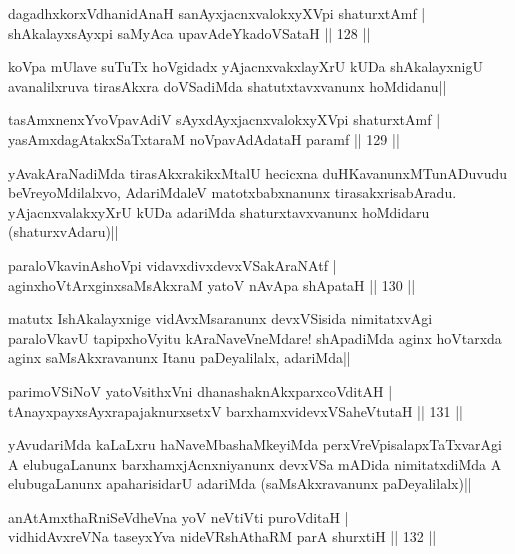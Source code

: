 \begin{shl}
dagadhxkorxVdhanidAnaH sanAyxjacnxvalokxyXV\s pi shaturxtAmf |\\
shAkalayxsAyxpi saMyAca upavAdeYkadoVSataH \hfill || 128 ||
\end{shl}

\begin{artha}
koVpa mUlave suTuTx hoVgidadx yAjacnxvakxlayXrU kUDa shAkalayxnigU avanalilxruva tirasAkxra doVSadiMda shatutxtavxvanunx hoMdidanu|| 
\end{artha}%

\begin{shl}
tasAmxnenxYvoVpavAdiV sAyxdAyxjacnxvalokxyXV\s pi shaturxtAmf |\\
yasAmxdagAtakxSaTxtaraM noVpavAdAdataH paramf \hfill || 129 ||
\end{shl}

\begin{artha}
yAvakAraNadiMda tirasAkxrakikxMtalU hecicxna duHKavanunxMTunADuvudu beVreyoMdilalxvo, AdariMdaleV matotxbabxnanunx tirasakxrisabAradu. yAjacnxvalakxyXrU kUDa adariMda shaturxtavxvanunx hoMdidaru (shaturxvAdaru)||
\end{artha}

\begin{shl}
paraloVkavinAshoV\s pi vidavxdivxdevxVSakAraNAtf |\\
aginxhoVtArxginxsaMsAkxraM yatoV nAvApa shApataH \hfill || 130 ||
\end{shl}

\begin{artha}
matutx IshAkalayxnige vidAvxMsaranunx devxVSisida nimitatxvAgi paraloVkavU tapipxhoVyitu kAraNaveVneMdare! shApadiMda aginx hoVtarxda aginx saMsAkxravanunx Itanu paDeyalilalx, adariMda||
\end{artha}

\begin{shl}
parimoVSiNoV yatoV\s sithxVni dhanashaknAkxparxcoVditAH |\\
tAnayxpayxsAyxrapajaknurxsetxV barxhamxvidevxVSaheVtutaH \hfill || 131 ||
\end{shl}

\begin{artha}
yAvudariMda kaLaLxru haNaveMbashaMkeyiMda perxVreVpisalapxTaTxvarAgi A elubugaLanunx barxhamxjAcnxniyanunx devxVSa mADida nimitatxdiMda A elubugaLanunx apaharisidarU adariMda (saMsAkxravanunx paDeyalilalx)||
\end{artha}

\begin{shl}
anAtAmxthaRniSeVdheVna yoV neVtiVti puroVditaH |\\
vidhidAvxreVNa taseyxYva nideVRshAthaRM parA shurxtiH \hfill || 132 ||
\end{shl}

